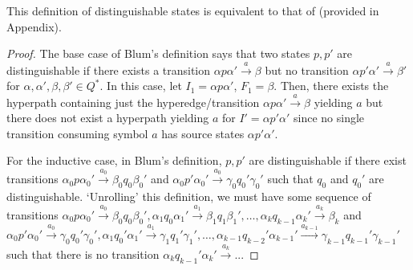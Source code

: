 \documentclass[11pt]{article}
\begin{document}
\begin{theorem}
  This definition of distinguishable states is equivalent to that of
  \cite{blum2019properties} (provided in Appendix).
\end{theorem}
\begin{proof}
  The base case of Blum's definition says that two states $p,p'$ are
  distinguishable if there exists a transition $\alpha p \alpha'
  \overset{a}{\rightarrow} \beta$ but no transition $\alpha p' \alpha'
  \overset{a}{\rightarrow} \beta'$ for $\alpha,\alpha',\beta,\beta' \in Q^*$. In
  this case, let $I_1 = \alpha p \alpha'$, $F_1 = \beta$. Then, there exists the
  hyperpath containing just the hyperedge/transition $\alpha p \alpha'
  \overset{a}{\rightarrow} \beta$ yielding $a$ but there does not exist a
  hyperpath yielding $a$ for $I' = \alpha p'\alpha'$ since no single transition
  consuming symbol $a$ has source states $\alpha p'\alpha'$.

  For the inductive case, in Blum's definition, $p,p'$ are distinguishable if
  there exist transitions $\alpha_0 p \alpha_0' \overset{a_0}{\rightarrow}
  \beta_0 q_0 \beta_0'$ and  $\alpha_0 p' \alpha_0' \overset{a_0}{\rightarrow}
  \gamma_0 q_0' \gamma_0'$ such that $q_0$ and $q_0'$ are distinguishable.
  `Unrolling' this definition, we must have some sequence of transitions
  $\alpha_0 p \alpha_0' \overset{a_0}{\rightarrow} \beta_0 q_0 \beta_0',
  \alpha_1 q_0 \alpha_1' \overset{a_1}{\rightarrow} \beta_1 q_1 \beta_1',\ldots,
  \alpha_k q_{k-1} \alpha_k' \overset{a_k}{\rightarrow} \beta_k$ and $\alpha_0
  p' \alpha_0' \overset{a_0}{\rightarrow} \gamma_0 q_0' \gamma_0', \alpha_1 q_0'
  \alpha_1' \overset{a_1}{\rightarrow} \gamma_1 q_1' \gamma_1',\ldots,
  \alpha_{k-1} q_{k-2}' \alpha_{k-1}' \overset{a_{k-1}}{\rightarrow}
  \gamma_{k-1} q_{k-1}' \gamma_{k-1}'$ such that there is no transition
  $\alpha_k q_{k-1}' \alpha_k' \overset{a_k}{\rightarrow} ...$


\end{proof}
\end{document}
